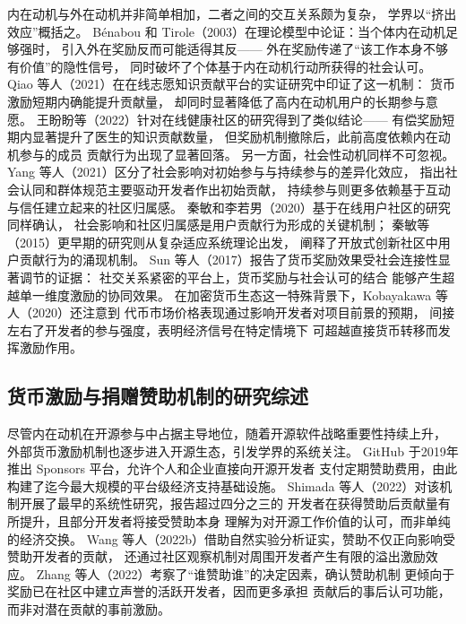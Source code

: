 内在动机与外在动机并非简单相加，二者之间的交互关系颇为复杂，
学界以“挤出效应”概括之。
Bénabou 和 Tirole（2003）在理论模型中论证：当个体内在动机足够强时，
引入外在奖励反而可能适得其反——
外在奖励传递了“该工作本身不够有价值”的隐性信号，
同时破坏了个体基于内在动机行动所获得的社会认可\cite{benabou2003intrinsic}。
Qiao 等人（2021）在在线志愿知识贡献平台的实证研究中印证了这一机制：
货币激励短期内确能提升贡献量，
却同时显著降低了高内在动机用户的长期参与意愿\cite{qiao2021mitigating}。
王盼盼等（2022）针对在线健康社区的研究得到了类似结论——
有偿奖励短期内显著提升了医生的知识贡献数量，
但奖励机制撤除后，此前高度依赖内在动机参与的成员
贡献行为出现了显著回落\cite{wang2022reward}。
另一方面，社会性动机同样不可忽视。
Yang 等人（2021）区分了社会影响对初始参与与持续参与的差异化效应，
指出社会认同和群体规范主要驱动开发者作出初始贡献，
持续参与则更多依赖基于互动与信任建立起来的社区归属感\cite{yang2021differential}。
秦敏和李若男（2020）基于在线用户社区的研究同样确认，
社会影响和社区归属感是用户贡献行为形成的关键机制\cite{qin2020contribution}；
秦敏等（2015）更早期的研究则从复杂适应系统理论出发，
阐释了开放式创新社区中用户贡献行为的涌现机制\cite{qin2015cas}。
Sun 等人（2017）报告了货币奖励效果受社会连接性显著调节的证据：
社交关系紧密的平台上，货币奖励与社会认可的结合
能够产生超越单一维度激励的协同效果\cite{sun2017motivation}。
在加密货币生态这一特殊背景下，Kobayakawa 等人（2020）还注意到
代币市场价格表现通过影响开发者对项目前景的预期，
间接左右了开发者的参与强度，表明经济信号在特定情境下
可超越直接货币转移而发挥激励作用\cite{kobayakawa2020impact}。

\subsection{货币激励与捐赠赞助机制的研究综述}

尽管内在动机在开源参与中占据主导地位，随着开源软件战略重要性持续上升，
外部货币激励机制也逐步进入开源生态，引发学界的系统关注。
GitHub 于2019年推出 Sponsors 平台，允许个人和企业直接向开源开发者
支付定期赞助费用，由此构建了迄今最大规模的平台级经济支持基础设施。
Shimada 等人（2022）对该机制开展了最早的系统性研究，报告超过四分之三的
开发者在获得赞助后贡献量有所提升，且部分开发者将接受赞助本身
理解为对开源工作价值的认可，而非单纯的经济交换\cite{shimada2022github}。
Wang 等人（2022b）借助自然实验分析证实，赞助不仅正向影响受赞助开发者的贡献，
还通过社区观察机制对周围开发者产生有限的溢出激励效应\cite{wang2022influence}。
Zhang 等人（2022）考察了“谁赞助谁”的决定因素，确认赞助机制
更倾向于奖励已在社区中建立声誉的活跃开发者，因而更多承担
贡献后的事后认可功能，而非对潜在贡献的事前激励\cite{zhang2022who}。

